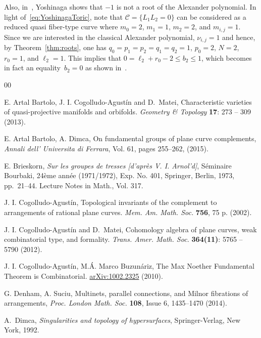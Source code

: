 \documentclass[11pt]{amsart}
\def\cC{\mathcal{C}}
\theoremstyle{plain}
\theoremstyle{definition}
\begin{document}
Also, in~\cite[Proposition 4.2]{Y}, Yoshinaga shows that $-1$ is not a root of the Alexander polynomial.
In light of~\eqref{eq:YoshinagaToric}, note that $\cC=\{L_1L_2=0\}$ can be considered as a reduced quasi fiber-type curve where $m_0=2$, $m_1=1$, $m_2=2$, and $m_{i,j}=1$. Since we are interested in the classical Alexander polynomial, $\nu_{i,j}=1$ and hence, by Theorem~\ref{thm:roots}, one has $q_0=p_1=p_2=q_1=q_2=1$, $p_0=2$, $N=2$, $r_0=1$, and $\ell_2=1$. This implies that $0=\ell_2 + r_0 -2\leq b_2\leq 1$, which becomes in fact an equality~$b_2=0$ as shown in~\cite{Y}. 

\begin{thebibliography}{00}

  E. Artal Bartolo, J. I. Cogolludo-Agust\'in and D.~Matei,
 Characteristic varieties of quasi-projective manifolds and orbifolds. 
 {\it Geometry \& Topology} {\bf  17}: 273 -- 309 (2013).

 E. Artal Bartolo, A. Dimca, On fundamental groups of plane curve complements, {\it Annali dell' Universita di Ferrara}, Vol. 61, pages 255--262, (2015).

E. Brieskorn, \emph{Sur les groupes de tresses [d'apr\`es {V}. {I}.
  {A}rnol'd]}, S\'eminaire Bourbaki, 24\`eme ann\'ee (1971/1972), Exp.
  No. 401, Springer, Berlin, 1973, pp.~21--44. Lecture Notes in Math., Vol.
  317. 

 J. I. Cogolludo-Agust\'in, Topological invariants of the complement to arrangements of rational plane curves. \textit{Mem. Am. Math. Soc.} \textbf{756}, 75 p. (2002).

 J. I. Cogolludo-Agust\'in and D.~Matei,
Cohomology algebra of plane curves, weak combinatorial type, and formality. \textit{Trans. Amer. Math. Soc.}  \textbf{364(11)}: 5765 -- 5790 (2012).

 J. I. Cogolludo-Agust\'in, M.\'A. Marco Buzun\'ariz, 
The Max Noether Fundamental Theorem is Combinatorial. \href{https://arxiv.org/abs/1002.2325}{arXiv:1002.2325} (2010).

 G. Denham, A. Suciu, Multinets, parallel connections, and Milnor fibrations of arrangements, {\it Proc. London Math. Soc.} {\bf 108}, Issue 6, 1435--1470  (2014).

A.~Dimca, \emph{Singularities and topology of hypersurfaces}, Springer-Verlag,
  New York, 1992. 



\end{thebibliography}
\end{document}
